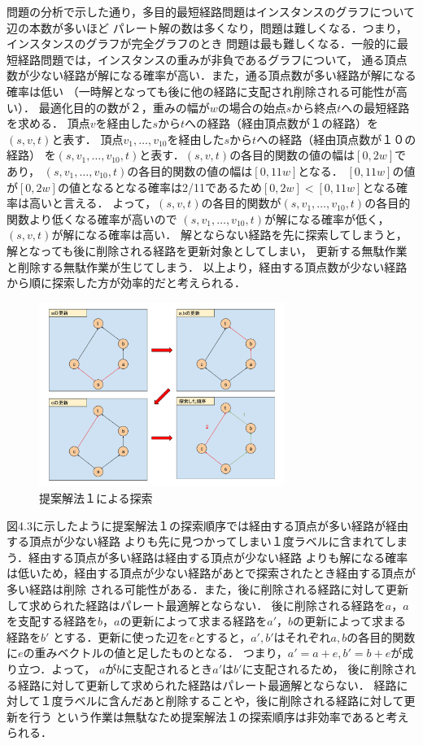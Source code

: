 \documentclass[12pt]{optlab-bachelor}
\begin{document}
問題の分析で示した通り，多目的最短経路問題はインスタンスのグラフについて辺の本数が多いほど
パレート解の数は多くなり，問題は難しくなる．つまり，インスタンスのグラフが完全グラフのとき
問題は最も難しくなる．一般的に最短経路問題では，インスタンスの重みが非負であるグラフについて，
通る頂点数が少ない経路が解になる確率が高い．また，通る頂点数が多い経路が解になる確率は低い
（一時解となっても後に他の経路に支配され削除される可能性が高い）．
最適化目的の数が２，重みの幅が$w$の場合の始点$s$から終点$t$への最短経路を求める．
頂点$v$を経由した$s$から$t$への経路（経由頂点数が１の経路）を$(s,v,t)$と表す．
頂点$v_1,\ldots,v_10$を経由した$s$から$t$への経路（経由頂点数が１０の経路）
を$(s,v_1,\ldots,v_10,t)$と表す．$(s,v,t)$の各目的関数の値の幅は$[0,2w]$であり，
$(s,v_1,\ldots,v_10,t)$の各目的関数の値の幅は$[0,11w]$となる．
$[0,11w]$の値が$[0,2w]$の値となるとなる確率は2/11であるため$[0,2w]<[0,11w]$となる確率は高いと言える．
よって，$(s,v,t)$の各目的関数が$(s,v_1,\ldots,v_10,t)$の各目的関数より低くなる確率が高いので
$(s,v_1,\ldots,v_10,t)$が解になる確率が低く，$(s,v,t)$が解になる確率は高い．
解とならない経路を先に探索してしまうと，解となっても後に削除される経路を更新対象としてしまい，
更新する無駄作業と削除する無駄作業が生じてしまう．
以上より，経由する頂点数が少ない経路から順に探索した方が効率的だと考えられる．


\begin{figure}[htbp]
  \centering
  \caption{提案解法１による探索}
  \includegraphics[height=6.0cm, width=8.0cm]{fig/fig6.pdf}
\end{figure}

図4.3に示したように提案解法１の探索順序では経由する頂点が多い経路が経由する頂点が少ない経路
よりも先に見つかってしまい１度ラベルに含まれてしまう．経由する頂点が多い経路は経由する頂点が少ない経路
よりも解になる確率は低いため，経由する頂点が少ない経路があとで探索されたとき経由する頂点が多い経路は削除
される可能性がある．また，後に削除される経路に対して更新して求められた経路はパレート最適解とならない．
後に削除される経路を$a$，$a$を支配する経路を$b$，$a$の更新によって求まる経路を$a'$，$b$の更新によって求まる経路を$b'$
とする．更新に使った辺を$e$とすると，$a',b'$はそれぞれ$a,b$の各目的関数に$e$の重みベクトルの値と足したものとなる．
つまり，$a'=a+e,b'=b+e$が成り立つ．よって， $a$が$b$に支配されるとき$a'$は$b'$に支配されるため，
後に削除される経路に対して更新して求められた経路はパレート最適解とならない．
経路に対して１度ラベルに含んだあと削除することや，後に削除される経路に対して更新を行う
という作業は無駄なため提案解法１の探索順序は非効率であると考えられる．
\end{document}
